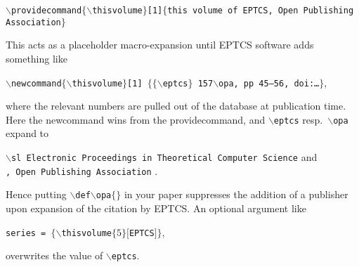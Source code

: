 \documentclass[submission,copyright,creativecommons]{eptcs}
\begin{document}
\noindent
{\small \tt $\backslash$providecommand$\{\backslash$thisvolume$\}$[1]$\{$this
  volume of EPTCS, Open Publishing Association$\}$}

\noindent
This acts as a placeholder macro-expansion until EPTCS software adds
something like

\noindent
{\small \tt $\backslash$newcommand$\{\backslash$thisvolume$\}$[1]%
  $\{\{\backslash$eptcs$\}$ 157$\backslash$opa, pp 45--56, doi:\dots$\}$},

\noindent
where the relevant numbers are pulled out of the database at publication time.
Here the newcommand wins from the providecommand, and {\tt \small $\backslash$eptcs}
resp.\ {\tt \small $\backslash$opa} expand to

\noindent
{\small \tt $\backslash$sl Electronic Proceedings in Theoretical Computer Science} \hfill and\\
{\small \tt , Open Publishing Association} \hfill .

\noindent
Hence putting {\small \tt $\backslash$def$\backslash$opa$\{\}$} in
your paper suppresses the addition of a publisher upon expansion of the citation by EPTCS\@.
An optional argument like
\begin{center}
  {\tt series    = $\{\backslash$thisvolume$\{5\}[$EPTCS$]\}$},
\end{center}
overwrites the value of {\tt \small $\backslash$eptcs}.

\nocite{*}


\end{document}
